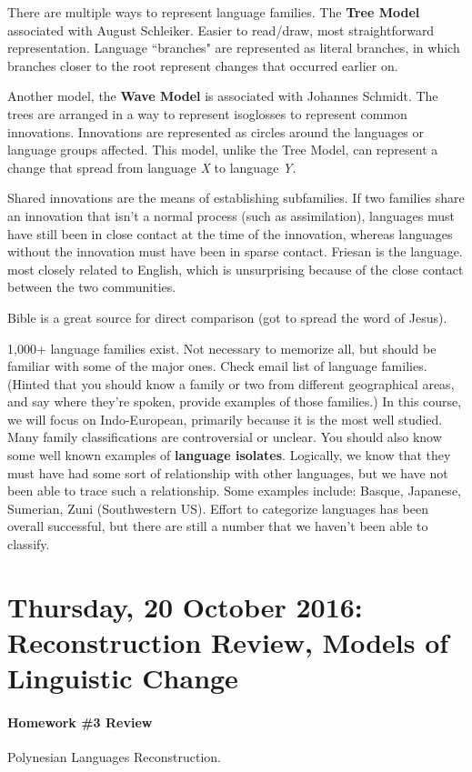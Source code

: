 \documentclass{exam}
\begin{document}
There are multiple ways to represent language families. The \textbf{Tree Model} associated with August Schleiker. Easier to read/draw, most straightforward representation. Language ``branches" are represented as literal branches, in which branches closer to the root represent changes that occurred earlier on. 


Another model, the \textbf{Wave Model} is associated with Johannes Schmidt. The trees are arranged in a way to represent isoglosses to represent common innovations. Innovations are represented as circles around the languages or language groups affected. This model, unlike the Tree Model, can represent a change that spread from language \textit{X} to language \textit{Y}. 

Shared innovations are the means of establishing subfamilies. If two families share an innovation that isn't a normal process (such as assimilation), languages must have still been in close contact at the time of the innovation, whereas languages without the innovation must have been in sparse contact. Friesan is the language. most closely related to English, which is unsurprising because of the close contact between the two communities. 

Bible is a great source for direct comparison (got to spread the word of Jesus). 


1,000+ language families exist. Not necessary to memorize all, but should be familiar with some of the major ones. Check email list of language families. (Hinted that you should know a family or two from different geographical areas, and say where they're spoken, provide examples of those families.) In this course, we will focus on Indo-European, primarily because it is the most well studied. Many family classifications are controversial or unclear. You should also know some well known examples of \textbf{language isolates}. Logically, we know that they must have had some sort of relationship with other languages, but we have not been able to trace such a relationship. Some examples include: Basque, Japanese, Sumerian, Zuni (Southwestern US). Effort to categorize languages has been overall successful, but there are still a number that we haven't been able to classify. 

\section*{Thursday, 20 October 2016: Reconstruction Review, Models of Linguistic Change}

\paragraph{Homework \#3 Review} Polynesian Languages Reconstruction. 
\end{document}
